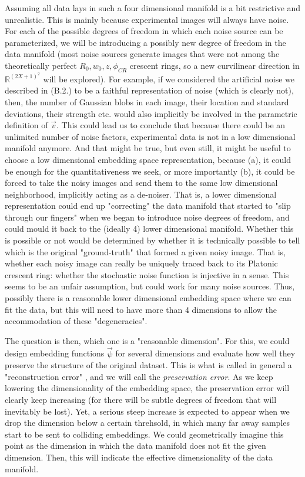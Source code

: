 \documentclass[11pt, a4paper, twoside]{article} %
\newcommand{\R}{\mathbb{R}} %
\begin{document}
Assuming all data lays in such a four dimensional manifold is a bit restrictive and unrealistic. This is mainly because experimental images will always have noise. For each of the possible degrees of freedom in which each noise source can be parameterized, we will be introducing a possibly new degree of freedom in the data manifold (most noise sources generate images that were not among the theoretically perfect $R_0,w_0,z,\phi_{CR}$ crescent rings, so a new curvilinear direction in $\R^{(2X+1)^2}$ will be explored). For example, if we considered the artificial noise we described in (B.2.) to be a faithful representation of noise (which is clearly not), then, the number of Gaussian blobs in each image, their location and standard deviations, their strength etc. would also implicitly be involved in the parametric definition of $\vec{v}$. This could lead us to conclude that because there could be an unlimited number of noise factors, experimental data is not in a low dimensional manifold anymore. And that might be true, but even still, it might be useful to choose a low dimensional embedding space representation, because (a), it could be enough for the quantitativeness we seek, or more importantly (b), it could be forced to take the noisy images and send them to the same low dimensional neighborhood, implicitly acting as a de-noiser. That is, a lower dimensional representation could end up "correcting" the data manifold that started to "slip through our fingers" when we began to introduce noise degrees of freedom, and could mould it back to the (ideally 4) lower dimensional manifold. Whether this is possible or not would be determined by whether it is technically possible to tell which is the original "ground-truth" that formed a given noisy image. That is, whether each noisy image can really be uniquely traced back to its Platonic crescent ring: whether the stochastic noise function is injective in a sense. This seems to be an unfair assumption, but could work for many noise sources. Thus, possibly there is a reasonable lower dimensional embedding space where we can fit the data, but this will need to have more than 4 dimensions to allow the accommodation of these "degeneracies".


The question is then, which one is a "reasonable dimension". For this, we could design embedding functions $\vec{\psi}$ for several dimensions and evaluate how well they preserve the structure of the original dataset. This is what is called in general a "reconstruction error" \cite{manifold}, and we will call the {\em preservation error}. As we keep lowering the dimensionality of the embedding space, the preservation error will clearly keep increasing (for there will be subtle degrees of freedom that will inevitably be lost). Yet, a serious steep increase is expected to appear when we drop the dimension below a certain threhsold, in which many far away samples start to be sent to colliding embeddings. We could geometrically imagine this point as the dimension in which the data manifold does not fit the given dimension. Then, this will indicate the effective dimensionality of the data manifold.
\end{document}
